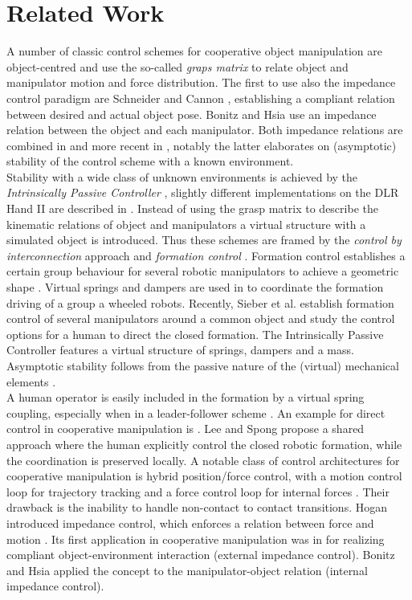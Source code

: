 \documentclass[a4paper,twoside, openright,12pt]{report}
\begin{document}
\section{Related Work}
A number of classic control schemes for cooperative object manipulation are object-centred and use the so-called \emph{graps matrix} to relate object and manipulator motion and force distribution. The first to use also the impedance control paradigm \cite{Hogan_84} are Schneider and Cannon \cite{Schneider_92}, establishing a compliant relation between desired and actual object pose. Bonitz and Hsia \cite{Bonitz_96} use an impedance relation between the object and each manipulator. Both impedance relations are combined in \cite{Caccavale_01,Caccavale_08} and more recent in \cite{Heck_13}, notably the latter elaborates on (asymptotic) stability of the control scheme with a known environment.\\
Stability with a wide class of unknown environments is achieved by the \emph{Intrinsically Passive Controller} \cite{Stramigioli_01}, slightly different implementations on the DLR Hand II are described in \cite{Wimboeck_06,Wimboeck_08}. Instead of using the grasp matrix to describe the kinematic relations of object and manipulators a virtual structure with a simulated object is introduced. Thus these schemes are framed by the \emph{control by interconnection} approach \cite{Ortega_08}  and \emph{formation control} \cite{Lawton_03}. Formation control establishes a certain group behaviour for several robotic manipulators to achieve a geometric shape \cite{VosDiss_15}. Virtual springs and dampers are used in \cite{Vos_14} to coordinate the formation driving of a group a wheeled robots. Recently, Sieber et al. \cite{Sieber_15} establish formation control of several manipulators around a common object and study the control options for a human to direct the closed formation. The Intrinsically Passive Controller features a virtual structure of springs, dampers and a mass. Asymptotic stability follows from the passive nature of the (virtual) mechanical elements \cite{Stramigioli_15}.\\
A human operator is easily included in the formation by a virtual spring coupling, especially when in a leader-follower scheme \cite{Scheggi_14}. An example for direct control in cooperative manipulation is \cite{Goertz_52}. Lee and Spong \cite{Lee_05} propose a shared approach where the human explicitly control the closed robotic formation, while the coordination is preserved locally.
A notable class of control architectures for cooperative manipulation is hybrid position/force control, with a motion control loop for trajectory tracking and a force control loop for internal forces \cite{Wen_92,Hsu_93}. Their drawback is the inability to handle non-contact to contact transitions. Hogan introduced impedance control, which enforces a relation between force and motion \cite{Hogan_84}. Its first application in cooperative manipulation was in  for realizing compliant object-environment interaction (external impedance control). Bonitz and Hsia  applied the concept to the manipulator-object relation (internal impedance control).\\
\end{document}

